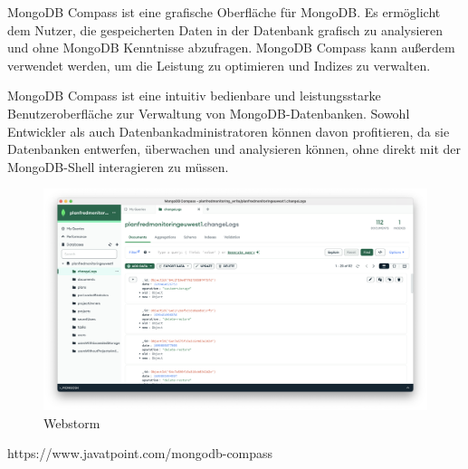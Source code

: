 MongoDB Compass ist eine grafische Oberfläche für MongoDB. Es ermöglicht dem Nutzer, die gespeicherten Daten in der Datenbank grafisch zu analysieren und ohne MongoDB Kenntnisse abzufragen. MongoDB Compass kann außerdem verwendet werden, um die Leistung zu optimieren und Indizes zu verwalten.\newline

MongoDB Compass ist eine intuitiv bedienbare und leistungsstarke Benutzeroberfläche zur Verwaltung von MongoDB-Datenbanken. Sowohl Entwickler als auch Datenbankadministratoren können davon profitieren, da sie Datenbanken entwerfen, überwachen und analysieren können, ohne direkt mit der MongoDB-Shell interagieren zu müssen.

\begin{figure}[h!]
    \centering
    \includegraphics[width=1\linewidth]{pics/mongodb-compass.png}
    \caption{Webstorm}
    \label{fig:enter-label}
\end{figure}



https://www.javatpoint.com/mongodb-compass

